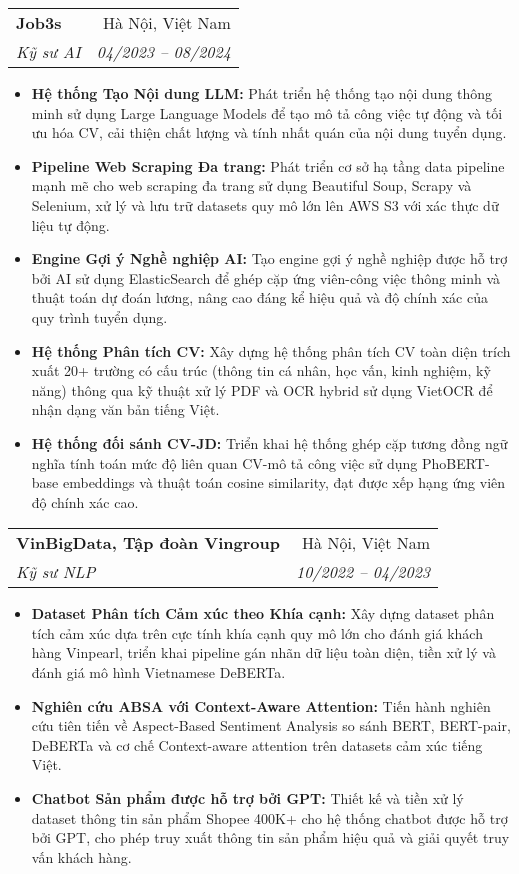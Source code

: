 \documentclass[letterpaper,11pt]{article}
\makeatletter
\newcommand{\resumeItem}[1]{
  \item\small{
    {#1 \vspace{-2pt}}
  }
}
\newcommand{\resumeSubheading}[4]{
  \vspace{-2pt}\item
    \begin{tabular*}{1.0\textwidth}[t]{l@{\extracolsep{\fill}}r}
      \textbf{#1} & \small #2 \\
      \textit{\small#3} & \textit{\small #4} \\
      
    \end{tabular*}\vspace{-7pt}
}
\newcommand{\resumeItemListStart}{\justify \begin{itemize}}
\newcommand{\resumeItemListEnd}{\end{itemize}\vspace{-2pt}}
\makeatother
\begin{document}
    \resumeSubheading
      {Job3s}{Hà Nội, Việt Nam}
      {Kỹ sư AI}{ 04/2023 -- 08/2024}
      \vspace{-7pt}
      \resumeItemListStart
        \resumeItem{\textbf{Hệ thống Tạo Nội dung LLM:} Phát triển hệ thống tạo nội dung thông minh sử dụng Large Language Models để tạo mô tả công việc tự động và tối ưu hóa CV, cải thiện chất lượng và tính nhất quán của nội dung tuyển dụng.}
        \resumeItem{\textbf{Pipeline Web Scraping Đa trang:} Phát triển cơ sở hạ tầng data pipeline mạnh mẽ cho web scraping đa trang sử dụng Beautiful Soup, Scrapy và Selenium, xử lý và lưu trữ datasets quy mô lớn lên AWS S3 với xác thực dữ liệu tự động.}
        \resumeItem{\textbf{Engine Gợi ý Nghề nghiệp AI:} Tạo engine gợi ý nghề nghiệp được hỗ trợ bởi AI sử dụng ElasticSearch để ghép cặp ứng viên-công việc thông minh và thuật toán dự đoán lương, nâng cao đáng kể hiệu quả và độ chính xác của quy trình tuyển dụng.}
        \resumeItem{\textbf{Hệ thống Phân tích CV:} Xây dựng hệ thống phân tích CV toàn diện trích xuất 20+ trường có cấu trúc (thông tin cá nhân, học vấn, kinh nghiệm, kỹ năng) thông qua kỹ thuật xử lý PDF và OCR hybrid sử dụng VietOCR để nhận dạng văn bản tiếng Việt.}
        \resumeItem{\textbf{Hệ thống đối sánh CV-JD:} Triển khai hệ thống ghép cặp tương đồng ngữ nghĩa tính toán mức độ liên quan CV-mô tả công việc sử dụng PhoBERT-base embeddings và thuật toán cosine similarity, đạt được xếp hạng ứng viên độ chính xác cao.}
     \resumeItemListEnd
     
    \resumeSubheading
      {VinBigData, Tập đoàn Vingroup}{Hà Nội, Việt Nam}
      {Kỹ sư NLP}{ 10/2022 -- 04/2023}
      \vspace{-7pt}
      \resumeItemListStart
        \resumeItem{\textbf{Dataset Phân tích Cảm xúc theo Khía cạnh:} Xây dựng dataset phân tích cảm xúc dựa trên cực tính khía cạnh quy mô lớn cho đánh giá khách hàng Vinpearl, triển khai pipeline gán nhãn dữ liệu toàn diện, tiền xử lý và đánh giá mô hình Vietnamese DeBERTa.}
        \resumeItem{\textbf{Nghiên cứu ABSA với Context-Aware Attention:} Tiến hành nghiên cứu tiên tiến về Aspect-Based Sentiment Analysis so sánh BERT, BERT-pair, DeBERTa và cơ chế Context-aware attention trên datasets cảm xúc tiếng Việt.}
        \resumeItem{\textbf{Chatbot Sản phẩm được hỗ trợ bởi GPT:} Thiết kế và tiền xử lý dataset thông tin sản phẩm Shopee 400K+ cho hệ thống chatbot được hỗ trợ bởi GPT, cho phép truy xuất thông tin sản phẩm hiệu quả và giải quyết truy vấn khách hàng.}
     \resumeItemListEnd
     
\end{document}
